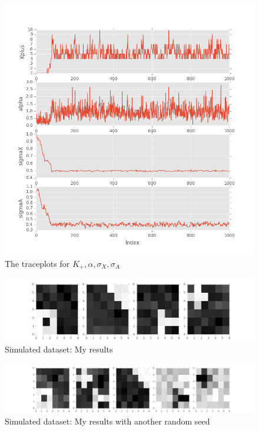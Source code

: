 \begin{figure}[!ht]
\centering
    \includegraphics[width=0.65\linewidth]{Version1_Naive_Code/IBP_plot_results.png}
    \vspace{-20pt}
    \caption{The traceplots for $K_+, \alpha, \sigma_X, \sigma_A$}
    \label{fig:plotresults}
\end{figure}

\begin{figure}[!ht]
\centering
    \includegraphics[width=\linewidth]{Version1_Naive_Code/IBP_image_results.png}
    \caption{Simulated dataset: My results}
    \label{fig:imageresults}
\end{figure}

\begin{figure}[!ht]
\centering
    \includegraphics[width=\linewidth]{Version0_Wrong/IBP_image_results_K5.png}
    \caption{Simulated dataset: My results with another random seed}
    \label{fig:imageresultsK5}
\end{figure}

